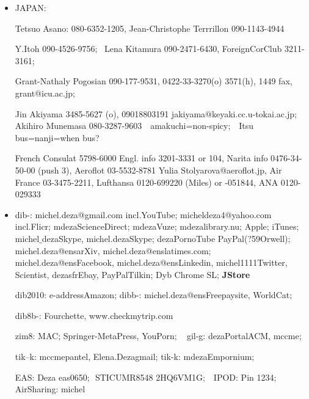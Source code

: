 \documentclass[12pt]{article}
\begin{document}
\thispagestyle{empty}

\begin{itemize}
\item
JAPAN: 


 Tetsuo Asano: 080-6352-1205,  Jean-Christophe Terrrillon 090-1143-4944

Y.Itoh 090-4526-9756; $\,$ Lena Kitamura
090-2471-6430, ForeignCorClub 3211-3161;

 Grant-Nathaly Pogosian 090-177-9531, 
0422-33-3270(o) 3571(h), 1449 fax, grant@icu.ac.jp; 

Jin Akiyama 3485-5627 (o), 09018803191 
jakiyama@keyaki.cc.u-tokai.ac.jp;
Akihiro Munemasa 080-3287-9603 $\,\,$ amakuchi=non-spicy; $\,\,$ Itsu 
bus=nanji=when bus?


French Consulat 5798-6000
Engl. info 3201-3331 or 104,
Narita info 0476-34-50-00 (push 3), 
Aeroflot 03-5532-8781 Yulia Stolyarova@aeroflot.jp,
Air France 03-3475-2211, Lufthansa 0120-699220 (Miles) or -051844, ANA 
0120-029333


\item

dib-:  michel.deza@gmail.com incl.YouTube;  
micheldeza4@yahoo.com incl.Flicr; mdezaScienceDirect;
 mdezaVuze; mdezalibrary.nu; Apple; iTunes; michel$\_$dezaSkype,
michel.dezaSkype; dezaPornoTube PayPal(?59Orwell); 
michel.deza@ensarXiv, michel.deza@enslatimes.com; michel.deza@ensFacebook,
michel.deza@ensLinkedin,   
michel1111Twitter,  
Scientist,  
 dezasfrEbay,
PayPalTilkin;  Dyb
Chrome SL; {\bf JStore}

dib2010: e-addressAmazon;
dibb-: michel.deza@ensFreepaysite, WorldCat; 

dib8b-: Fourchette, www.checkmytrip.com

zim8: MAC; Springer-MetaPress, YouPorn; $\,\,\,$ 
gil-g: dezaPortalACM, mccme;
 

 

tik--k: mccmepantel, Elena.Dezagmail; tik-k: mdezaEmpornium;


EAS: Deza eas0650;$\,\,$  STICUMR8548  2HQ6VM1G; $\,\,$
 IPOD: Pin 1234; AirSharing:  michel


\end{itemize}
\end{document}
